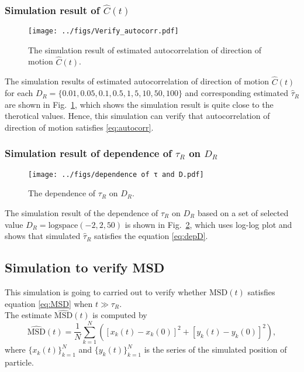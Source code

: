 \documentclass[runningheads]{llncs}
\begin{document}
\subsubsection*{Simulation result of $\hat{C}(t)$}
\hfill\break

\begin{figure}
    \centering
    \texttt{[image: ../figs/Verify\_autocorr.pdf]}
    \caption{The simulation result of estimated autocorrelation of direction of motion $\hat{C}(t)$.} \label{fig:corr}
\end{figure}

\noindent The simulation results of estimated autocorrelation of direction of motion $\hat{C}(t)$ for each $D_R=\{0.01,0.05,0.1,0.5,1,5,10,50,100\}$ 
and corresponding estimated $\hat{\tau}_R$
are shown in Fig.~\ref{fig:corr}, which shows the simulation result is quite close to the therotical values.
Hence, this simulation can verify that autocorrelation of direction of motion satisfies \eqref{eq:autocorr}.

\newpage
\subsubsection*{Simulation result of dependence of $\tau_R$ on $D_R$}
\hfill\break

\begin{figure}
    \centering
    \texttt{[image: ../figs/dependence of τ and D.pdf]}
    \caption{The dependence of $\tau_R$ on $D_R$.} \label{fig:depD}
\end{figure}

\noindent The simulation result of the dependence of $\tau_R$ on $D_R$ based on a set of selected value $D_R=\text{logspace}(-2,2,50)$ is shown in Fig.~\ref{fig:depD},
which uses log-log plot and shows that simulated $\hat{\tau}_R$ satisfies the equation \eqref{eq:depD}.

\subsection{Simulation to verify MSD}
This simulation is going to carried out to verify whether $\text{MSD}(t)$ satisfies equation \eqref{eq:MSD} when $t\gg\tau_R$.\\
The estimate $\widehat{\text{MSD}}(t)$ is computed by
\begin{equation}
    \widehat{\text{MSD}}(t)=\frac1N\sum_{k=1}^N\left(\left[x_k(t)-x_k(0)\right]^2+\left[y_k(t)-y_k(0)\right]^2\right),
\end{equation} 
where $\{x_k(t)\}_{k=1}^N$ and $\{y_k(t)\}_{k=1}^N$ is the series of the simulated position of particle.
\end{document}
